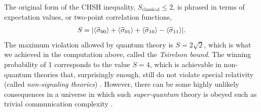 The original form of the CHSH inequality, $S_{\textrm{classical}} \le 2$, is phrased in terms of expectation values, or two-point correlation functions,
\begin{align}
	S = \abs{\left\langle \widehat{\sigma}_{00} \right\rangle + \left\langle \widehat{\sigma}_{01} \right\rangle + \left\langle \widehat{\sigma}_{10} \right\rangle - \left\langle \widehat{\sigma}_{11} \right\rangle}.
\end{align}
The maximum violation allowed by quantum theory is $S = 2\sqrt{2}$, which is what we achieved in the computation above, called the \emph{Tsirelson bound}. The winning probability of 1 corresponds to the value $S=4$, which is achievable in non-quantum theories that, surprisingly enough, still do not violate special relativity (called \emph{non-signaling theories}) \cite{pr-box}. However, there can be some highly unlikely consequences in a universe in which such  \emph{super-quantum} theory is obeyed such as trivial communication complexity \cite{vandam2012}.


